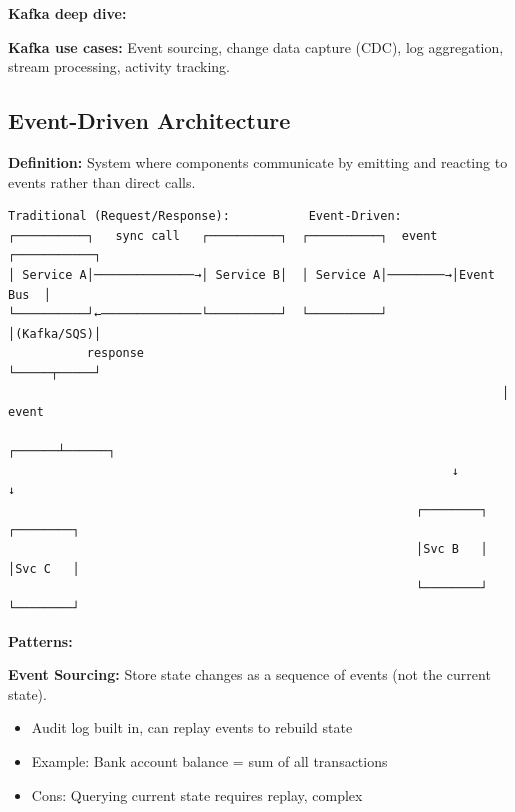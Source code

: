 \documentclass[11pt]{article}
\providecommand{\tightlist}{\setlength{\itemsep}{1pt}\setlength{\parskip}{0pt}}
\begin{document}
\textbf{Kafka deep dive:}

\textbf{Kafka use cases:} Event sourcing, change data capture (CDC), log aggregation, stream processing, activity tracking.

\subsection{Event-Driven Architecture}\label{event-driven-architecture}

\textbf{Definition:} System where components communicate by emitting and reacting to events rather than direct calls.

\setcodelang{}

\begin{verbatim}
Traditional (Request/Response):           Event-Driven:
┌──────────┐   sync call   ┌──────────┐  ┌──────────┐  event  ┌───────────┐
│ Service A│──────────────→│ Service B│  │ Service A│────────→│Event Bus  │
└──────────┘←──────────────└──────────┘  └──────────┘         │(Kafka/SQS)│
           response                                            └─────┬─────┘
                                                                     │ event
                                                              ┌──────┴──────┐
                                                              ↓             ↓
                                                         ┌────────┐  ┌────────┐
                                                         │Svc B   │  │Svc C   │
                                                         └────────┘  └────────┘
\end{verbatim}

\textbf{Patterns:}

\textbf{Event Sourcing:} Store state changes as a sequence of events (not the current state).

\begin{itemize}
\tightlist
\item
  Audit log built in, can replay events to rebuild state
\item
  Example: Bank account balance = sum of all transactions
\item
  Cons: Querying current state requires replay, complex
\end{itemize}
\end{document}
